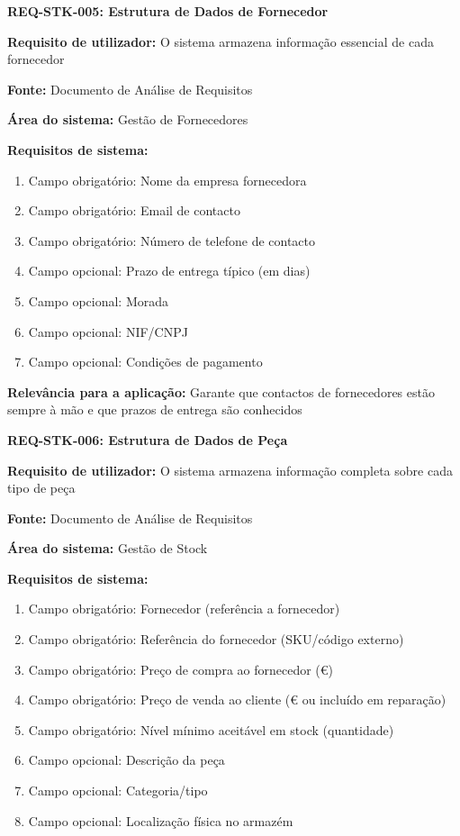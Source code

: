 \documentclass[11pt,a4paper]{article}
\newcommand{\reqheader}[1]{{\noindent\large\bfseries\color{sectionblue}#1}\par\vspace{0.3cm}}
\newcommand{\reqfield}[2]{{\noindent\textbf{#1:} #2}\par\vspace{0.2cm}}
\begin{document}
\vspace{0.8cm}

\reqheader{REQ-STK-005: Estrutura de Dados de Fornecedor}

\reqfield{Requisito de utilizador}{O sistema armazena informação essencial de cada fornecedor}

\reqfield{Fonte}{Documento de Análise de Requisitos}

\reqfield{Área do sistema}{Gestão de Fornecedores}

\reqfield{Requisitos de sistema}{
	\begin{enumerate}
		\item Campo obrigatório: Nome da empresa fornecedora
		\item Campo obrigatório: Email de contacto
		\item Campo obrigatório: Número de telefone de contacto
		\item Campo opcional: Prazo de entrega típico (em dias)
		\item Campo opcional: Morada
		\item Campo opcional: NIF/CNPJ
		\item Campo opcional: Condições de pagamento
	\end{enumerate}
}

\reqfield{Relevância para a aplicação}{Garante que contactos de fornecedores estão sempre à mão e que prazos de entrega são conhecidos}

\vspace{0.8cm}

\reqheader{REQ-STK-006: Estrutura de Dados de Peça}

\reqfield{Requisito de utilizador}{O sistema armazena informação completa sobre cada tipo de peça}

\reqfield{Fonte}{Documento de Análise de Requisitos}

\reqfield{Área do sistema}{Gestão de Stock}

\reqfield{Requisitos de sistema}{
	\begin{enumerate}
		\item Campo obrigatório: Fornecedor (referência a fornecedor)
		\item Campo obrigatório: Referência do fornecedor (SKU/código externo)
		\item Campo obrigatório: Preço de compra ao fornecedor (€)
		\item Campo obrigatório: Preço de venda ao cliente (€ ou incluído em reparação)
		\item Campo obrigatório: Nível mínimo aceitável em stock (quantidade)
		\item Campo opcional: Descrição da peça
		\item Campo opcional: Categoria/tipo
		\item Campo opcional: Localização física no armazém
	\end{enumerate}
}
\end{document}

